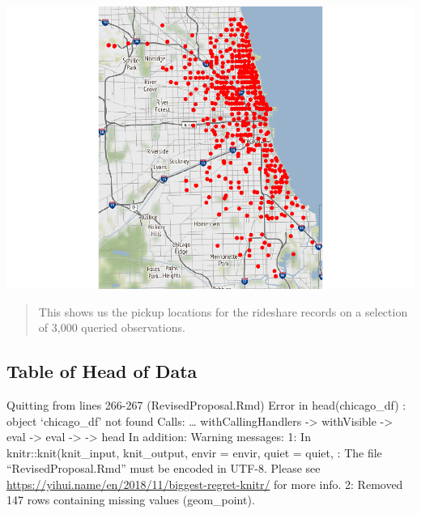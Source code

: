\documentclass[]{article}
\newenvironment{Shaded}{\begin{snugshade}}{\end{snugshade}}
\newcommand{\CommentTok}[1]{\textcolor[rgb]{0.56,0.35,0.01}{\textit{#1}}}
\newcommand{\DataTypeTok}[1]{\textcolor[rgb]{0.13,0.29,0.53}{#1}}
\newcommand{\DecValTok}[1]{\textcolor[rgb]{0.00,0.00,0.81}{#1}}
\newcommand{\KeywordTok}[1]{\textcolor[rgb]{0.13,0.29,0.53}{\textbf{#1}}}
\newcommand{\NormalTok}[1]{#1}
\newcommand{\OperatorTok}[1]{\textcolor[rgb]{0.81,0.36,0.00}{\textbf{#1}}}
\newcommand{\StringTok}[1]{\textcolor[rgb]{0.31,0.60,0.02}{#1}}
\begin{document}
\begin{Shaded}
\end{Shaded}

\includegraphics{RevisedProposal_files/figure-latex/unnamed-chunk-4-1.pdf}

\begin{quote}
This shows us the pickup locations for the rideshare records on a
selection of 3,000 queried observations.
\end{quote}

\hypertarget{table-of-head-of-data}{%
\subsection{Table of Head of Data}\label{table-of-head-of-data}}

Quitting from lines 266-267 (RevisedProposal.Rmd) Error in
head(chicago\_df) : object `chicago\_df' not found Calls: \ldots{}
withCallingHandlers -\textgreater{} withVisible -\textgreater{} eval
-\textgreater{} eval -\textgreater{} -\textgreater{} head In addition:
Warning messages: 1: In knitr::knit(knit\_input, knit\_output, envir =
envir, quiet = quiet, : The file ``RevisedProposal.Rmd'' must be encoded
in UTF-8. Please see
\url{https://yihui.name/en/2018/11/biggest-regret-knitr/} for more info.
2: Removed 147 rows containing missing values (geom\_point).
\end{document}
